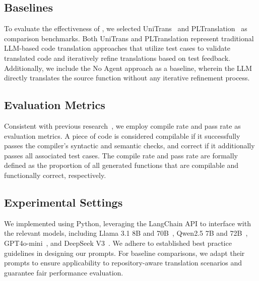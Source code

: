 \subsection{Baselines}
To evaluate the effectiveness of \toolname, we selected UniTrans~\cite{yang2024exploring} and PLTranslation~\cite{pan2024lost} as comparison benchmarks. Both UniTrans and PLTranslation represent traditional LLM-based code translation approaches that utilize test cases to validate translated code and iteratively refine translations based on test feedback. Additionally, we include the No Agent approach as a baseline, wherein the LLM directly translates the source function without any iterative refinement process.

\subsection{Evaluation Metrics}
Consistent with previous research~\cite{yang2024exploring,pan2024lost,yin2024rectifier}, we employ compile rate and pass rate as evaluation metrics. A piece of code is considered compilable if it successfully passes the compiler's syntactic and semantic checks, and correct if it additionally passes all associated test cases. The compile rate and pass rate are formally defined as the proportion of all generated functions that are compilable and functionally correct, respectively.

\subsection{Experimental Settings}
We implemented \toolname using Python, leveraging the LangChain API to interface with the relevant models, including Llama 3.1 8B and 70B~\cite{grattafiori2024llama}, Qwen2.5 7B and 72B~\cite{yang2025qwen3}, GPT4o-mini~\cite{hurst2024gpt}, and DeepSeek V3~\cite{liu2024deepseek}. We adhere to established best practice guidelines in designing our prompts. For baseline comparisons, we adapt their prompts to ensure applicability to repository-aware translation scenarios and guarantee fair performance evaluation.